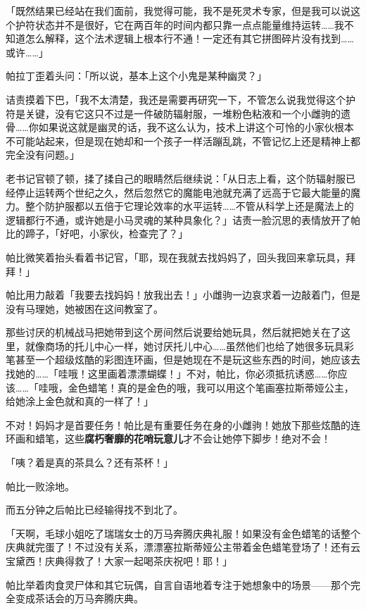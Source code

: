「既然结果已经站在我们面前，我觉得可能，我不是死灵术专家，但是我可以说这个护符状态并不是很好，它在两百年的时间内都只靠一点点能量维持运转……我不知道怎么解释，这个法术逻辑上根本行不通！一定还有其它拼图碎片没有找到……或许……」

帕拉丁歪着头问：「所以说，基本上这个小鬼是某种幽灵？」

诘责摸着下巴，「我不太清楚，我还是需要再研究一下，不管怎么说我觉得这个护符是关键，没有它这只不过是一件破防辐射服，一堆粉色粘液和一个小雌驹的遗骨……你如果说这就是幽灵的话，我不这么认为，技术上讲这个可怜的小家伙根本不可能站起来，但是现在她却和一个孩子一样活蹦乱跳，不管记忆上还是精神上都完全没有问题。」

老书记官顿了顿，揉了揉自己的眼睛然后继续说：「从日志上看，这个防辐射服已经停止运转两个世纪之久，然后忽然它的魔能电池就充满了远高于它最大能量的魔力。整个防护服都以五倍于它理论效率的水平运转……不管从科学上还是魔法上的逻辑都行不通，或许她是小马灵魂的某种具象化？」诘责一脸沉思的表情放开了帕比的蹄子，「好吧，小家伙，检查完了？」

帕比微笑着抬头看着书记官，「耶，现在我就去找妈妈了，回头我回来拿玩具，拜拜！」

\horizonline


帕比用力敲着「我要去找妈妈！放我出去！」小雌驹一边哀求着一边敲着门，但是没有马理她，她被困在这间教室了。

那些讨厌的机械战马把她带到这个房间然后说要给她玩具，然后就把她关在了这里，就像商场的托儿中心一样，她讨厌托儿中心……虽然他们也给了她很多玩具彩笔甚至一个超级炫酷的彩图连环画，但是她现在不是玩这些东西的时间，她应该去找她的……「哇哦！这里画着漂漂蝴蝶！」不对，帕比，你必须抵抗诱惑……你应该……「哇哦，金色蜡笔！真的是金色的哦，我可以用这个笔画塞拉斯蒂娅公主，给她涂上金色就和真的一样了！」

不对！妈妈才是首要任务！帕比是有重要任务在身的小雌驹！她放下那些炫酷的连环画和蜡笔，这些\textbf{腐朽奢靡的花哨玩意儿}才不会让她停下脚步！绝对不会！

「咦？着是真的茶具么？还有茶杯！」

帕比一败涂地。

而五分钟之后帕比已经输得找不到北了。

「天啊，毛球小姐吃了瑞瑞女士的万马奔腾庆典礼服！如果没有金色蜡笔的话整个庆典就完蛋了！不过没有关系，漂漂塞拉斯蒂娅公主带着金色蜡笔登场了！还有云宝黛西！庆典得救了！大家一起喝茶庆祝吧！耶！」

帕比举着肉食灵尸体和其它玩偶，自言自语地着专注于她想象中的场景——那个完全变成茶话会的万马奔腾庆典。


